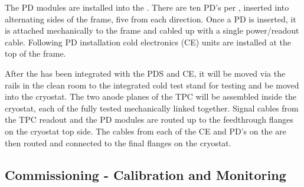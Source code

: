 


The PD modules are installed into the . There are ten PD's per , inserted into alternating sides of the  frame, five from each direction. Once a PD is inserted, it is attached mechanically to the  frame  and cabled up with a single power/readout cable. Following PD installation cold electronics (CE) units are installed at the top of the  frame.

After the  has been integrated with the PDS and CE, it will be moved via the rails in the clean room to the integrated cold test stand for testing and be moved into the cryostat. The two anode planes of the TPC will be assembled inside the cryostat, each of the fully tested  mechanically linked together. Signal cables from the TPC readout and the PD modules are routed up to the feedthrough flanges on the cryostat top side. The cables from each of the CE and PD's on the  are then routed and connected to the final flanges on the cryostat.


\subsection{Commissioning - Calibration and Monitoring}
\label{sec:fdsp-pd-install-calib}


